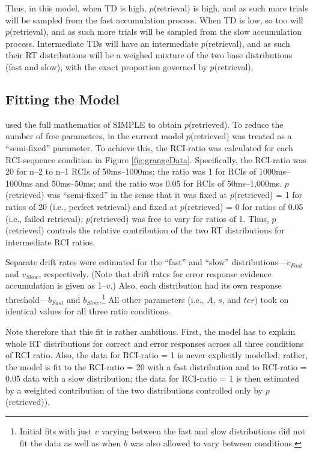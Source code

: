 \documentclass[a4paper, jou, natbib]{apa6}
\begin{document}
Thus, in this model, when TD is high, $p$(retrieval) is high, and as such more trials will be sampled from the fast accumulation process. When TD is low, so too will  $p$(retrieval), and as such more trials will be sampled from the slow accumulation process. Intermediate TDs will have an intermediate $p$(retrieval), and as such their RT distributions will be a weighed mixture of the two base distributions (fast and slow), with the exact proportion governed by $p$(retrieval). 

\subsection{Fitting the Model}

\cite{Grange2015} used the full mathematics of SIMPLE to obtain $p$(retrieved). To reduce the number of free parameters, in the current model $p$(retrieved) was treated as a ``semi-fixed'' parameter. To achieve this, the RCI-ratio was calculated for each RCI-sequence condition in Figure \ref{fig:grangeData}. Specifically, the RCI-ratio was 20 for n--2 to n--1 RCIs of 50ms--1000ms; the ratio was 1 for RCIs of 1000ms--1000ms and 50ms--50ms; and the ratio was 0.05 for RCIs of 50ms--1,000ms. $p$(retrieved) was ``semi-fixed'' in the sense that it was fixed at $p$(retrieved) = 1 for ratios of 20 (i.e., perfect retrieval) and fixed at $p$(retrieved) = 0 for ratios of 0.05 (i.e., failed retrieval); $p$(retrieved) was free to vary for ratios of 1. Thus, $p$(retrieved) controls the relative contribution of the two RT distributions for intermediate RCI ratios.

Separate drift rates were estimated for the ``fast'' and ``slow'' distributions---$v_{Fast}$ and $v_{Slow}$, respectively. (Note that drift rates for error response evidence accumulation is given as 1--$v$.) Also, each distribution had its own response threshold---$b_{Fast}$ and $b_{Slow}$.\footnote{Initial fits with just $v$ varying between the fast and slow distributions did not fit the data as well as when $b$ was also allowed to vary between conditions.} All other parameters (i.e., $A$, $s$, and $ter$) took on identical values for all three ratio conditions. 

Note therefore that this fit is rather ambitious. First, the model has to explain whole RT distributions for correct and error responses across all three conditions of RCI ratio. Also, the data for RCI-ratio = 1 is never explicitly modelled; rather, the model is fit to the RCI-ratio = 20 with a fast distribution and to RCI-ratio = 0.05 data with a slow distribution; the data for RCI-ratio = 1 is then estimated by a weighted contribution of the two distributions controlled only by $p$(retrieved)). 
\end{document}
